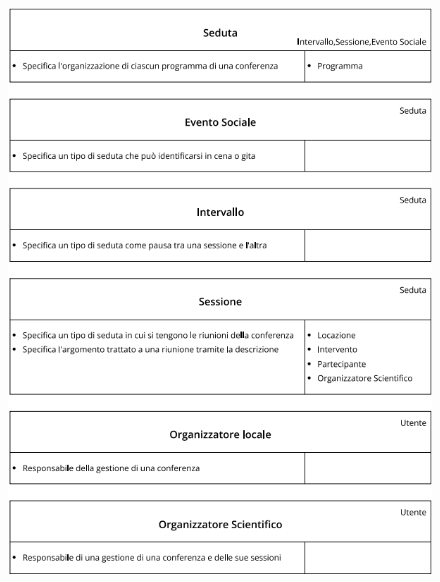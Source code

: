 \documentclass[a4paper,italian,10pt,openany]{book}
\begin{document}
	\begin{figure}[h!]
	\centering
	\includegraphics[width=17cm]{crc_cards2}
	\end{figure}
\end{document}
